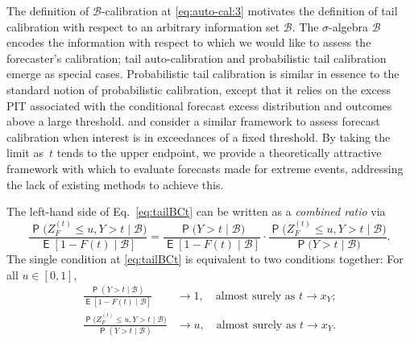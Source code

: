 \documentclass[12pt]{article}
\newcommand{\E}{\operatorname{\mathsf{E}}}
\newcommand{\Q}{\operatorname{\mathsf{P}}}
\newcommand{\Bb}{\mathcal{B}}
\newcommand{\1}{\mathbf{1}} %
\newcommand{\ZFt}{Z_{F}^{(t)}} %
\theoremstyle{definition}
\begin{document}
The definition of $\Bb$-calibration at \eqref{eq:auto-cal:3} motivates the definition of tail calibration with respect to an arbitrary information set $\Bb$. The $\sigma$-algebra $\Bb$ encodes the information with respect to which we would like to assess the forecaster's calibration; tail auto-calibration and probabilistic tail calibration emerge as special cases. Probabilistic tail calibration is similar in essence to the standard notion of probabilistic calibration, except that it relies on the excess PIT associated with the conditional forecast excess distribution and outcomes above a large threshold. \cite{AllenEtAl2023b} and \cite{MitchellWeale2023} consider a similar framework to assess forecast calibration when interest is in exceedances of a fixed threshold. By taking the limit as~$t$ tends to the upper endpoint, we provide a theoretically attractive framework with which to evaluate forecasts made for extreme events, addressing the lack of existing methods to achieve this.


The left-hand side of Eq.~\eqref{eq:tailBCt} can be written as a \emph{combined ratio} via
\[
	\frac{\Q\bigl(\ZFt \le u, Y > t \mid \Bb\bigr)}{\E[1 - F(t) \mid \Bb]}
	=
	\frac{\Q\bigl(Y > t \mid \Bb\bigr)}{\E[1 - F(t) \mid \Bb]}
	\cdot
	\frac{\Q\bigl(\ZFt \le u, Y > t \mid \Bb\bigr)}{\Q\bigl(Y > t \mid \Bb\bigr)}.
\]
The single condition at \eqref{eq:tailBCt} is equivalent to two conditions together: For all $u \in [0,1]$,
\begin{align}
    \frac{\Q(Y > t \mid \Bb)}{\E[1 - F(t) \mid \Bb]}
    &\to 1, 
    \quad \text{almost surely as $t \to x_Y$;} 
    \label{eq:tailBC:occ}\\
    \frac{\Q\bigl(\ZFt \le u, Y > t \mid \Bb\bigr)}{\Q(Y > t \mid \Bb)} 
    &\to u, 
    \quad \text{almost surely as $t \to x_Y$.} 
    \label{eq:tailBC:sev}
\end{align}
\end{document}
